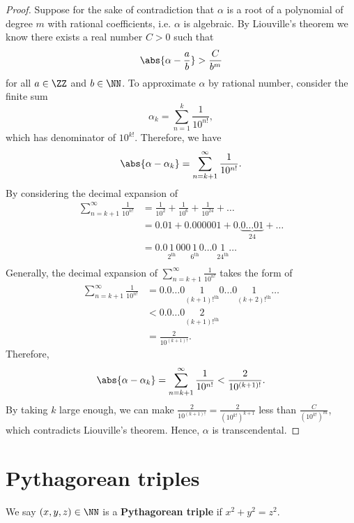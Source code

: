 \documentclass[12pt, a4paper]{article}
\begin{document}
\begin{proof}
    Suppose for the sake of contradiction that \(\alpha\) is a root of a polynomial of degree \(m\) with rational coefficients, i.e. \(\alpha\) is algebraic. By Liouville's theorem we know there exists a real number \(C>0\) such that 
    \[\abs{\alpha-\frac{a}{b}} > \frac{C}{b^m}\]
    for all \(a\in \ZZ\) and \(b\in \NN\). 
    To approximate \(\alpha\) by rational number, consider the finite sum
    \[\alpha_k = \sum_{n=1}^k \frac{1}{10^{n!}},\]
    which has denominator of \(10^{k!}\). Therefore, we have 
    \[\abs{\alpha-\alpha_k} = \sum_{n=k+1}^{\infty} \frac{1}{10^{n!}}.\]
    By considering the decimal expansion of 
    \[\begin{aligned}
        \sum_{n=k+1}^{\infty} \frac{1}{10^{n!}} &= \frac{1}{10^2}+\frac{1}{10^6}+\frac{1}{10^{24}} +\ldots\\
        &= 0.01+0.000001+0.\underbrace{0\ldots01}_{24} +\ldots \\
        &= 0.0\underset{2^{\text{th}}}{1}000\underset{6^{\text{th}}}{1}0\ldots0\underset{24^{\text{th}}}{1}\ldots \\
    \end{aligned}\]
    Generally, the decimal expansion of \(\sum_{n=k+1}^{\infty} \frac{1}{10^{n!}}\) takes the form of 
    \[\begin{aligned}
        \sum_{n=k+1}^{\infty} \frac{1}{10^{n!}} &= 0.0\ldots0 \underset{(k+1)!^{\text{th}}}{1} 0 \ldots 0\underset{(k+2)!^{\text{th}}}{1} \ldots \\  
        &< 0.0\ldots0 \underset{(k+1)!^{\text{th}}}{2} \\
        &= \frac{2}{10^{(k+1)!}}.
    \end{aligned}\] 
    Therefore, 
    \[\abs{\alpha-\alpha_k} = \sum_{n=k+1}^{\infty} \frac{1}{10^{n!}}<\frac{2}{10^{(k+1)!}}.\]
    By taking \(k\) large enough, we can make \(\frac{2}{10^{(k+1)!}}= \frac{2}{\left( 10^{k!} \right)^{k+1}}\) less than \(\frac{C}{\left( 10^{k!} \right)^m}\), which contradicts Liouville's theorem. Hence, \(\alpha\) is transcendental.
\end{proof}

\section{Pythagorean triples}

\begin{definition}
    We say \((x,y,z) \in \NN\) is a \textbf{Pythagorean triple} if \(x^2+y^2=z^2\).
\end{definition}
\end{document}
